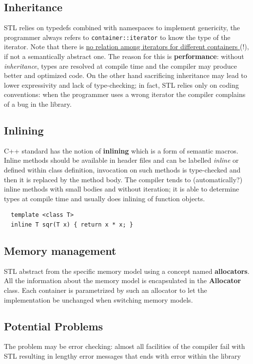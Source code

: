\subsection{Inheritance}
STL relies on typedefs combined with namespaces to
implement genericity, the programmer always refers to \lstinline|container::iterator| to know the type of the iterator.
Note that there is \ul{no relation among iterators for different containers }(!), if not a semantically abstract one.
The reason for this is \textbf{performance}: 
without \textit{inheritance}, types are resolved at compile time and the compiler may produce better and optimized code.
On the other hand sacrificing inheritance may lead to
lower expressivity and lack of type-checking;
in fact, STL relies only on coding conventions:
when the programmer uses a wrong iterator the compiler complains of a bug in the library.

\subsection{Inlining}
C++ standard has the notion of \textbf{inlining} which is a form of semantic macros.
Inline methods should be available in header files
and can be labelled \textit{inline} or defined within class
definition, invocation on such methods is type-checked and then it is
replaced by the method body.
The compiler tends to (automatically?)
inline methods with small bodies and without iteration; 
it is able to determine types at compile
time and usually does inlining of function objects.

\lstset{language=C++}
\begin{lstlisting}
  template <class T>
  inline T sqr(T x) { return x * x; }
\end{lstlisting}

\lstset{style=JavaBlock}

\subsection{Memory management}
STL abstract from the specific memory model using a concept named \textbf{allocators}.
All the information about the memory model is
encapsulated in the \textbf{Allocator} class.
Each container is parametrized by such an allocator to let
the implementation be unchanged when switching
memory models.

\subsection{Potential Problems}
The problem may be error checking: 
almost all facilities of the compiler fail with STL resulting in lengthy error messages that ends with error within the library